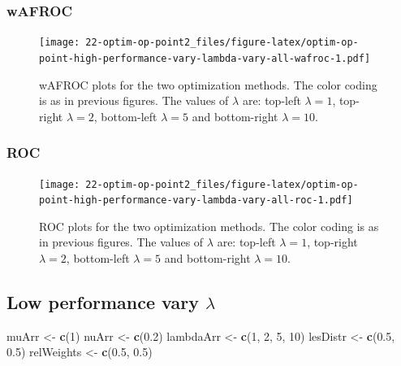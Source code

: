 \documentclass[
]{book}
\newenvironment{Shaded}{\begin{snugshade}}{\end{snugshade}}
\newcommand{\DecValTok}[1]{\textcolor[rgb]{0.00,0.00,0.81}{#1}}
\newcommand{\FloatTok}[1]{\textcolor[rgb]{0.00,0.00,0.81}{#1}}
\newcommand{\KeywordTok}[1]{\textcolor[rgb]{0.13,0.29,0.53}{\textbf{#1}}}
\newcommand{\NormalTok}[1]{#1}
\newcommand{\StringTok}[1]{\textcolor[rgb]{0.31,0.60,0.02}{#1}}
\begin{document}
\hypertarget{wafroc-7}{%
\subsubsection{wAFROC}\label{wafroc-7}}

\begin{figure}
\centering
\texttt{[image: 22-optim-op-point2\_files/figure-latex/optim-op-point-high-performance-vary-lambda-vary-all-wafroc-1.pdf]}
\caption{\label{fig:optim-op-point-high-performance-vary-lambda-vary-all-wafroc}wAFROC plots for the two optimization methods. The color coding is as in previous figures. The values of \(\lambda\) are: top-left \(\lambda = 1\), top-right \(\lambda = 2\), bottom-left \(\lambda = 5\) and bottom-right \(\lambda = 10\).}
\end{figure}

\hypertarget{roc-7}{%
\subsubsection{ROC}\label{roc-7}}

\begin{figure}
\centering
\texttt{[image: 22-optim-op-point2\_files/figure-latex/optim-op-point-high-performance-vary-lambda-vary-all-roc-1.pdf]}
\caption{\label{fig:optim-op-point-high-performance-vary-lambda-vary-all-roc}ROC plots for the two optimization methods. The color coding is as in previous figures. The values of \(\lambda\) are: top-left \(\lambda = 1\), top-right \(\lambda = 2\), bottom-left \(\lambda = 5\) and bottom-right \(\lambda = 10\).}
\end{figure}

\hypertarget{optim-op-point-low-performance-vary-lambda}{%
\subsection{\texorpdfstring{Low performance vary \(\lambda\)}{Low performance vary \textbackslash lambda}}\label{optim-op-point-low-performance-vary-lambda}}

\begin{Shaded}
\begin{Highlighting}[]
\NormalTok{muArr <-}\StringTok{ }\KeywordTok{c}\NormalTok{(}\DecValTok{1}\NormalTok{)}
\NormalTok{nuArr <-}\StringTok{ }\KeywordTok{c}\NormalTok{(}\FloatTok{0.2}\NormalTok{)}
\NormalTok{lambdaArr <-}\StringTok{ }\KeywordTok{c}\NormalTok{(}\DecValTok{1}\NormalTok{, }\DecValTok{2}\NormalTok{, }\DecValTok{5}\NormalTok{, }\DecValTok{10}\NormalTok{)}
\NormalTok{lesDistr <-}\StringTok{ }\KeywordTok{c}\NormalTok{(}\FloatTok{0.5}\NormalTok{, }\FloatTok{0.5}\NormalTok{)}
\NormalTok{relWeights <-}\StringTok{ }\KeywordTok{c}\NormalTok{(}\FloatTok{0.5}\NormalTok{, }\FloatTok{0.5}\NormalTok{)}
\end{Highlighting}
\end{Shaded}
\end{document}
